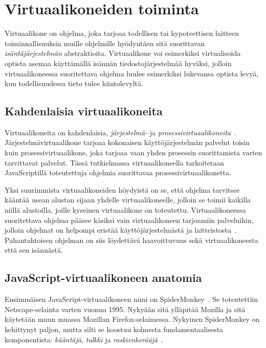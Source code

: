 \section{Virtuaalikoneiden toiminta}

Virtuaalikone on ohjelma, joka tarjoaa todellisen tai hypoteettisen laitteen toiminnallisuuksia muille ohjelmille hyödyntäen sitä suorittavan \textit{isäntäjärjestelmän} abstraktioita. Virtuaalikone voi esimerkiksi virtualisoida optista asemaa käyttämällä isännän tiedostojärjestelmää hyväksi, jolloin virtuaalikoneessa suoritettava ohjelma luulee esimerkiksi lukevansa optista levyä, kun todellisuudessa tieto tulee kiintolevyltä.

\subsection{Kahdenlaisia virtuaalikoneita}

Virtuaalikoneita on kahdenlaisia, \textit{järjestelmä-} ja \textit{prosessivirtuaalikoneita}~\cite[s.~33]{vms}. Järjestelmävirtuaalikone tarjoaa kokonaisen käyttöjärjestelmän palvelut toisin kuin prosessivirtuaalikone, joka tarjoaa vaan yhden prosessin suorittamista varten tarvittavat palvelut. Tässä tutkielmassa virtuaalikoneella tarkoitetaan JavaScriptillä toteutettuja ohjelmia suorittavaa prosessivirtuaalikonetta.

Yksi suurimmista virtuaalikoneiden höydyistä on se, että ohjelma tarvitsee kääntää usean alustan sijaan yhdelle virtuaalikoneelle, jolloin se toimii kaikilla niillä alustoilla, joille kyseinen virtuaalikone on toteutettu. Virtuaalikoneessa suoritettava ohjelma pääsee käsiksi vain virtuaalikoneen tarjoamiin palveluihin, jolloin ohjelmat on helpompi eristää käyttöjärjestelmästä ja laitteistosta~\cite[s.~36]{vms}. Pahantahtoisen ohjelman on siis löydettävä haavoittuvuus sekä virtuaalikoneesta että sen isännästä.

\subsection{JavaScript-virtuaalikoneen anatomia}

Ensimmäisen JavaScript-virtuaalikoneen nimi on SpiderMonkey~\cite{spidermonkey}. Se toteutettiin Netscape-selainta varten vuonna 1995. Nykyään sitä ylläpitää Mozilla ja sitä käytetään muun muassa Mozillan Firefox-selaimessa. Nykyinen SpiderMonkey on kehittynyt paljon, mutta silti se koostuu kolmesta fundamentaalisesta komponentista: \textit{kääntäjä}, \textit{tulkki} ja \textit{roskienkerääjä}~\cite{spidermonkeydesign}.

